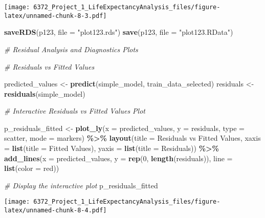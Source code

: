 \documentclass[
]{article}
\newenvironment{Shaded}{\begin{snugshade}}{\end{snugshade}}
\newcommand{\AttributeTok}[1]{\textcolor[rgb]{0.13,0.29,0.53}{#1}}
\newcommand{\CommentTok}[1]{\textcolor[rgb]{0.56,0.35,0.01}{\textit{#1}}}
\newcommand{\DecValTok}[1]{\textcolor[rgb]{0.00,0.00,0.81}{#1}}
\newcommand{\FunctionTok}[1]{\textcolor[rgb]{0.13,0.29,0.53}{\textbf{#1}}}
\newcommand{\NormalTok}[1]{#1}
\newcommand{\OtherTok}[1]{\textcolor[rgb]{0.56,0.35,0.01}{#1}}
\newcommand{\SpecialCharTok}[1]{\textcolor[rgb]{0.81,0.36,0.00}{\textbf{#1}}}
\newcommand{\StringTok}[1]{\textcolor[rgb]{0.31,0.60,0.02}{#1}}
\begin{document}
\texttt{[image: 6372\_Project\_1\_LifeExpectancyAnalysis\_files/figure-latex/unnamed-chunk-8-3.pdf]}

\begin{Shaded}
\begin{Highlighting}[]
\FunctionTok{saveRDS}\NormalTok{(p123, }\AttributeTok{file =} \StringTok{"plot123.rds"}\NormalTok{)}
\FunctionTok{save}\NormalTok{(p123, }\AttributeTok{file =} \StringTok{"plot123.RData"}\NormalTok{)}


\CommentTok{\# Residual Analysis and Diagnostics Plots}


\CommentTok{\# Residuals vs Fitted Values }

\NormalTok{predicted\_values }\OtherTok{\textless{}{-}} \FunctionTok{predict}\NormalTok{(simple\_model, train\_data\_selected)}
\NormalTok{residuals }\OtherTok{\textless{}{-}} \FunctionTok{residuals}\NormalTok{(simple\_model)}


\CommentTok{\# Interactive Residuals vs Fitted Values Plot}

\NormalTok{p\_residuals\_fitted }\OtherTok{\textless{}{-}} \FunctionTok{plot\_ly}\NormalTok{(}\AttributeTok{x =}\NormalTok{ predicted\_values, }\AttributeTok{y =}\NormalTok{ residuals, }\AttributeTok{type =} \StringTok{\textquotesingle{}scatter\textquotesingle{}}\NormalTok{, }\AttributeTok{mode =} \StringTok{\textquotesingle{}markers\textquotesingle{}}\NormalTok{) }\SpecialCharTok{\%\textgreater{}\%}
  \FunctionTok{layout}\NormalTok{(}\AttributeTok{title =} \StringTok{\textquotesingle{}Residuals vs Fitted Values\textquotesingle{}}\NormalTok{,}
         \AttributeTok{xaxis =} \FunctionTok{list}\NormalTok{(}\AttributeTok{title =} \StringTok{\textquotesingle{}Fitted Values\textquotesingle{}}\NormalTok{),}
         \AttributeTok{yaxis =} \FunctionTok{list}\NormalTok{(}\AttributeTok{title =} \StringTok{\textquotesingle{}Residuals\textquotesingle{}}\NormalTok{)) }\SpecialCharTok{\%\textgreater{}\%}
  \FunctionTok{add\_lines}\NormalTok{(}\AttributeTok{x =}\NormalTok{ predicted\_values, }\AttributeTok{y =} \FunctionTok{rep}\NormalTok{(}\DecValTok{0}\NormalTok{, }\FunctionTok{length}\NormalTok{(residuals)), }\AttributeTok{line =} \FunctionTok{list}\NormalTok{(}\AttributeTok{color =} \StringTok{\textquotesingle{}red\textquotesingle{}}\NormalTok{))}

\CommentTok{\# Display the interactive plot}
\NormalTok{p\_residuals\_fitted}
\end{Highlighting}
\end{Shaded}

\texttt{[image: 6372\_Project\_1\_LifeExpectancyAnalysis\_files/figure-latex/unnamed-chunk-8-4.pdf]}
\end{document}
